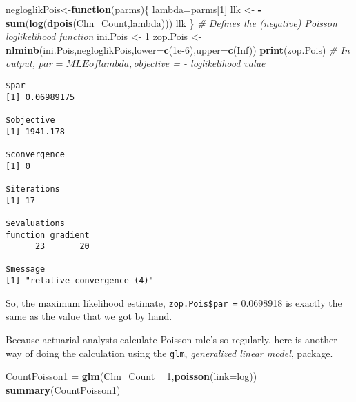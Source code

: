 \documentclass[]{book}
\newenvironment{Shaded}{\begin{snugshade}}{\end{snugshade}}
\newcommand{\KeywordTok}[1]{\textcolor[rgb]{0.13,0.29,0.53}{\textbf{#1}}}
\newcommand{\DataTypeTok}[1]{\textcolor[rgb]{0.13,0.29,0.53}{#1}}
\newcommand{\DecValTok}[1]{\textcolor[rgb]{0.00,0.00,0.81}{#1}}
\newcommand{\FloatTok}[1]{\textcolor[rgb]{0.00,0.00,0.81}{#1}}
\newcommand{\StringTok}[1]{\textcolor[rgb]{0.31,0.60,0.02}{#1}}
\newcommand{\CommentTok}[1]{\textcolor[rgb]{0.56,0.35,0.01}{\textit{#1}}}
\newcommand{\OtherTok}[1]{\textcolor[rgb]{0.56,0.35,0.01}{#1}}
\newcommand{\ControlFlowTok}[1]{\textcolor[rgb]{0.13,0.29,0.53}{\textbf{#1}}}
\newcommand{\OperatorTok}[1]{\textcolor[rgb]{0.81,0.36,0.00}{\textbf{#1}}}
\newcommand{\NormalTok}[1]{#1}
\theoremstyle{definition}
\theoremstyle{definition}
\theoremstyle{definition}
\theoremstyle{remark}
\begin{document}
\begin{Shaded}
\begin{Highlighting}[]
\NormalTok{negloglikPois<-}\ControlFlowTok{function}\NormalTok{(parms)\{}
\NormalTok{  lambda=parms[}\DecValTok{1}\NormalTok{]}
\NormalTok{  llk <-}\StringTok{ }\OperatorTok{-}\KeywordTok{sum}\NormalTok{(}\KeywordTok{log}\NormalTok{(}\KeywordTok{dpois}\NormalTok{(Clm_Count,lambda)))}
\NormalTok{  llk}
\NormalTok{\} }\CommentTok{# Defines the (negative) Poisson loglikelihood function}
\NormalTok{ini.Pois <-}\StringTok{ }\DecValTok{1} 
\NormalTok{zop.Pois <-}\StringTok{ }\KeywordTok{nlminb}\NormalTok{(ini.Pois,negloglikPois,}\DataTypeTok{lower=}\KeywordTok{c}\NormalTok{(}\FloatTok{1e-6}\NormalTok{),}\DataTypeTok{upper=}\KeywordTok{c}\NormalTok{(}\OtherTok{Inf}\NormalTok{))}
\KeywordTok{print}\NormalTok{(zop.Pois) }\CommentTok{# In output, $par = MLE of lambda, $objective = - loglikelihood value}
\end{Highlighting}
\end{Shaded}

\begin{verbatim}
$par
[1] 0.06989175

$objective
[1] 1941.178

$convergence
[1] 0

$iterations
[1] 17

$evaluations
function gradient 
      23       20 

$message
[1] "relative convergence (4)"
\end{verbatim}

So, the maximum likelihood estimate, \texttt{zop.Pois\$par\ =} 0.0698918
is exactly the same as the value that we got by hand.

Because actuarial analysts calculate Poisson mle's so regularly, here is
another way of doing the calculation using the \texttt{glm},
\emph{generalized linear model}, package.

\begin{Shaded}
\begin{Highlighting}[]
\NormalTok{CountPoisson1 =}\StringTok{ }\KeywordTok{glm}\NormalTok{(Clm_Count }\OperatorTok{~}\StringTok{ }\DecValTok{1}\NormalTok{,}\KeywordTok{poisson}\NormalTok{(}\DataTypeTok{link=}\NormalTok{log))}
\KeywordTok{summary}\NormalTok{(CountPoisson1)}
\end{Highlighting}
\end{Shaded}
\end{document}
